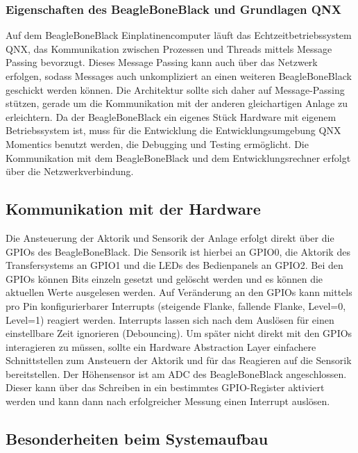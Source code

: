 \subsubsection{Eigenschaften des BeagleBoneBlack und Grundlagen QNX}

Auf dem BeagleBoneBlack Einplatinencomputer läuft das Echtzeitbetriebssystem QNX, das Kommunikation zwischen Prozessen und Threads mittels Message Passing bevorzugt.
Dieses Message Passing kann auch über das Netzwerk erfolgen, sodass Messages auch unkompliziert an einen weiteren BeagleBoneBlack geschickt werden können. 
Die Architektur sollte sich daher auf Message-Passing stützen, gerade um die Kommunikation mit der anderen gleichartigen Anlage zu erleichtern.
Da der BeagleBoneBlack ein eigenes Stück Hardware mit eigenem Betriebssystem ist, muss für die Entwicklung die Entwicklungsumgebung QNX Momentics benutzt werden, die Debugging und Testing ermöglicht.
Die Kommunikation mit dem BeagleBoneBlack und dem Entwicklungsrechner erfolgt über die Netzwerkverbindung.

\subsection{Kommunikation mit der Hardware}

Die Ansteuerung der Aktorik und Sensorik der Anlage erfolgt direkt über die GPIOs des BeagleBoneBlack. 
Die Sensorik ist hierbei an GPIO0, die Aktorik des Transfersystems an GPIO1 und die LEDs des Bedienpanels an GPIO2.
Bei den GPIOs können Bits einzeln gesetzt und gelöscht werden und es können die aktuellen Werte ausgelesen werden.
Auf Veränderung an den GPIOs kann mittels pro Pin konfigurierbarer Interrupts (steigende Flanke, fallende Flanke, Level=0, Level=1) reagiert werden.
Interrupts lassen sich nach dem Auslösen für einen einstellbare Zeit ignorieren (Debouncing).
Um später nicht direkt mit den GPIOs interagieren zu müssen, sollte ein Hardware Abstraction Layer einfachere Schnittstellen zum Ansteuern der Aktorik und für das Reagieren auf die Sensorik bereitstellen.
Der Höhensensor ist am ADC des BeagleBoneBlack angeschlossen. Dieser kann über das Schreiben in ein bestimmtes GPIO-Register aktiviert werden und kann dann nach erfolgreicher Messung einen Interrupt auslösen.

\subsection{Besonderheiten beim Systemaufbau}

